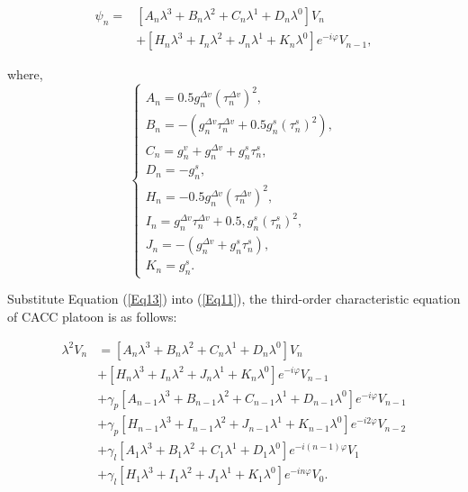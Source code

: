 \documentclass[journal]{IEEEtran}
\begin{document}
\begin{small}
\begin{equation}
\begin{aligned}
\psi_{n}\!=&\!\left[A_{n} \lambda^{3}\!+\!B_{n} \lambda^{2}\!+\!C_{n} \lambda^{1}\!+\!D_{n} \lambda^{0}\right] V_{n}\\
&+\!\left[H_{n} \lambda^{3}\!+\!I_{n} \lambda^{2}\!+\!J_{n} \lambda^{1}\!+\!K_{n} \lambda^{0}\right] e^{-i \varphi}V_{n-1},
\label{Eq12}
\end{aligned}
\end{equation}
\end{small}
where,
\begin{equation}
\left\{\begin{array}{l}
A_{n}=0.5 g_{n}^{\Delta v}\left(\tau_{n}^{\Delta v}\right)^{2}, \\
B_{n}=-\left(g_{n}^{\Delta v} \tau_{n}^{\Delta v}+0.5 g_{n}^{s}\left(\tau_{n}^{s}\right)^{2}\right), \\
C_{n}=g_{n}^{v}+g_{n}^{\Delta v}+g_{n}^{s} \tau_{n}^{s}, \\
D_{n}=-g_{n}^{s}, \\
H_{n}=-0.5 g_{n}^{\Delta v}\left(\tau_{n}^{\Delta v}\right)^{2}, \\
I_{n}=g_{n}^{\Delta v} \tau_{n}^{\Delta v}+0.5, g_{n}^{s}\left(\tau_{n}^{s}\right)^{2}, \\
J_{n}=-\left(g_{n}^{\Delta v}+g_{n}^{s} \tau_{n}^{s}\right), \\
K_{n}=g_{n}^{s}.
\end{array}\right.
\label{Eq13}
\end{equation}

Substitute Equation (\ref{Eq13}) into (\ref{Eq11}), the third-order characteristic equation of CACC platoon is as follows:

\begin{equation}
\begin{aligned}
\lambda^{2}V_{n}\!&=\!\left[A_{n} \lambda^{3}\!+\!B_{n} \lambda^{2}\!+\!C_{n} \lambda^{1}\!+\!D_{n} \lambda^{0}\right]V_{n}\!\\
&+\!\left[H_{n} \lambda^{3}\!+\!I_{n} \lambda^{2}\!+\!J_{n} \lambda^{1}\!+\!K_{n} \lambda^{0}\right] e^{-i \varphi} V_{n-1}\\
&+\gamma_{p}\left[A_{n-1} \lambda^{3}+B_{n-1} \lambda^{2}+C_{n-1} \lambda^{1}+D_{n-1} \lambda^{0}\right] e^{-i \varphi} V_{n-1}\\
&+\gamma_{p}\left[H_{n-1} \lambda^{3}+I_{n-1} \lambda^{2}+J_{n-1} \lambda^{1}+K_{n-1} \lambda^{0}\right] e^{-i 2 \varphi} V_{n-2}\\
&+\gamma_{l}\left[A_{1} \lambda^{3}+B_{1} \lambda^{2}+C_{1} \lambda^{1}+D_{1} \lambda^{0}\right] e^{-i(n-1) \varphi} V_{1}\\
&+\gamma_{l}\left[H_{1} \lambda^{3}+I_{1} \lambda^{2}+J_{1} \lambda^{1}+K_{1} \lambda^{0}\right] e^{-i n \varphi}V_{0}.
\end{aligned}
\label{Eq14}
\end{equation}
\end{document}
